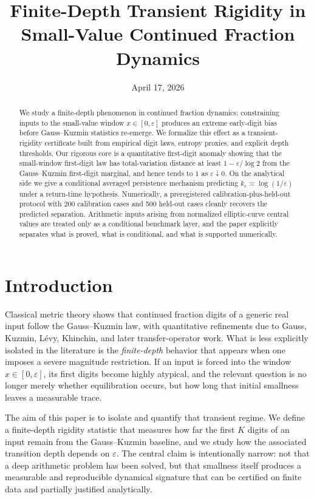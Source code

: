 \documentclass[11pt]{article}
\title{\textbf{Finite-Depth Transient Rigidity in Small-Value Continued Fraction Dynamics}}
\author{}
\date{April 17, 2026}
\begin{document}
\maketitle

\begin{abstract}
We study a finite-depth phenomenon in continued fraction dynamics: constraining inputs to the small-value window $x \in [0,\varepsilon]$ produces an extreme early-digit bias before Gauss--Kuzmin statistics re-emerge. We formalize this effect as a transient-rigidity certificate built from empirical digit laws, entropy proxies, and explicit depth thresholds. Our rigorous core is a quantitative first-digit anomaly showing that the small-window first-digit law has total-variation distance at least $1-\varepsilon/\log 2$ from the Gauss--Kuzmin first-digit marginal, and hence tends to $1$ as $\varepsilon\downarrow 0$. On the analytical side we give a conditional averaged persistence mechanism predicting $k_{\varepsilon} \asymp \log(1/\varepsilon)$ under a return-time hypothesis. Numerically, a preregistered calibration-plus-held-out protocol with 200 calibration cases and 500 held-out cases cleanly recovers the predicted separation. Arithmetic inputs arising from normalized elliptic-curve central values are treated only as a conditional benchmark layer, and the paper explicitly separates what is proved, what is conditional, and what is supported numerically.
\end{abstract}

\section{Introduction}

Classical metric theory shows that continued fraction digits of a generic real input follow the Gauss--Kuzmin law, with quantitative refinements due to Gauss, Kuzmin, L\'evy, Khinchin, and later transfer-operator work. What is less explicitly isolated in the literature is the \emph{finite-depth} behavior that appears when one imposes a severe magnitude restriction. If an input is forced into the window $x \in [0,\varepsilon]$, its first digits become highly atypical, and the relevant question is no longer merely whether equilibration occurs, but how long that initial smallness leaves a measurable trace.

The aim of this paper is to isolate and quantify that transient regime. We define a finite-depth rigidity statistic that measures how far the first $K$ digits of an input remain from the Gauss--Kuzmin baseline, and we study how the associated transition depth depends on $\varepsilon$. The central claim is intentionally narrow: not that a deep arithmetic problem has been solved, but that smallness itself produces a measurable and reproducible dynamical signature that can be certified on finite data and partially justified analytically.
\end{document}
